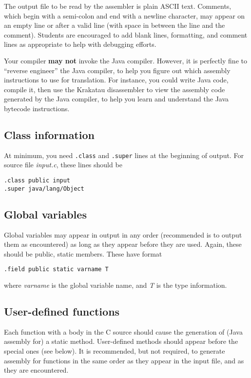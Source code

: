 \documentclass{article}
\begin{document}
The output file to be read by the assembler is plain ASCII text.
Comments,
which begin with a semi-colon and end with a newline character,
may appear on an empty line or
after a valid line (with space in between the line and the comment).
Students are encouraged to add blank lines,
formatting,
and comment lines as appropriate to help with debugging efforts.

Your compiler {\bf may not} invoke the Java compiler.
However, it is perfectly fine to ``reverse engineer'' the Java compiler,
to help you figure out which assembly instructions to use for translation.
For instance, you could write Java code, compile it, then use the Krakatau
disassembler to view the assembly code generated by the Java compiler,
to help you learn and understand the Java bytecode instructions.

\subsection{Class information}

At minimum, you need {\tt .class} and {\tt .super}
lines at the beginning of output.
For source file \emph{input.c},
these lines should be
\begin{lstlisting}[style=jvm, numbers=none]
.class public input
.super java/lang/Object
\end{lstlisting}

\subsection{Global variables}

Global variables may appear in output in any order
(recommended is to output them as encountered)
as long as they appear before they are used.
Again, these should be public, static members.
These have format
\begin{lstlisting}[style=jvm, numbers=none]
.field public static varname T
\end{lstlisting}
where \emph{varname} is the global variable name,
and \emph{T} is the type information.


\subsection{User-defined functions}

Each function with a body in the C source
should cause the generation of (Java assembly for)
a static method.
User-defined methods should appear before the special ones (see below).
It is recommended, but not required,
to generate assembly for functions in the same order as
they appear in the input file,
and as they are encountered.
\end{document}
